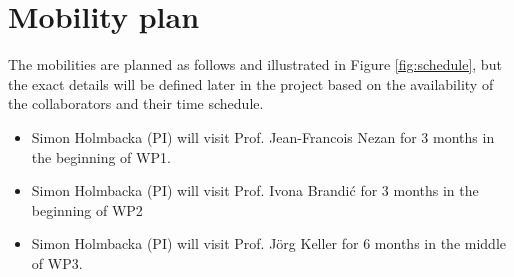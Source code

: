 \documentclass{article}
\begin{document}
\section{Mobility plan}
The mobilities are planned as follows and illustrated in Figure \ref{fig:schedule}, but the exact details will be defined later in the project based on the availability of the collaborators and their time schedule.
\begin{itemize}
 \item Simon Holmbacka (PI) will visit Prof. Jean-Francois Nezan for 3 months in the beginning of WP1. \vspace{-0.3cm}
 \item Simon Holmbacka (PI) will visit Prof. Ivona Brandi\'{c} for 3 months in the beginning of WP2 \vspace{-0.3cm}
 \item Simon Holmbacka (PI) will visit Prof. J\"{o}rg Keller for 6 months in the middle of WP3. \vspace{-0.3cm}
\end{itemize}


% 
% 
% 
% 
% 


{\footnotesize
}

\end{document}
